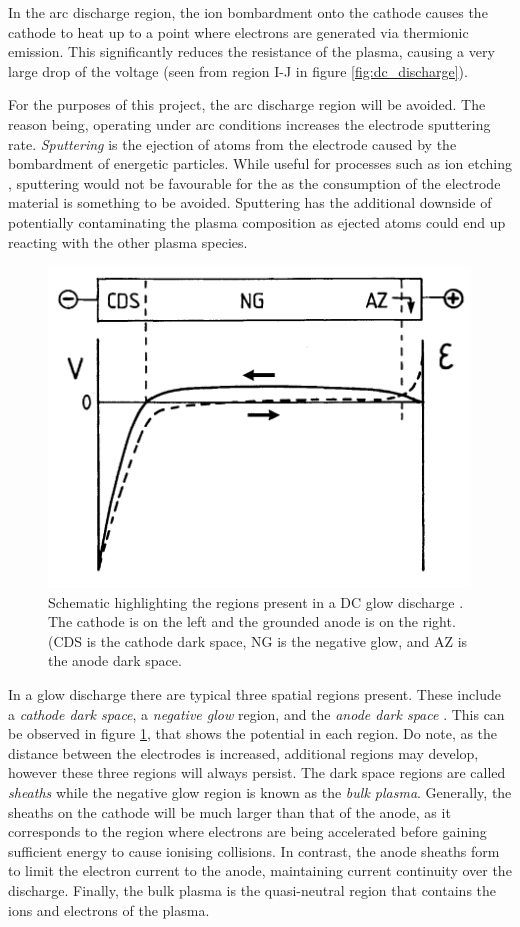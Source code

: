 In the arc discharge region, the ion bombardment onto the cathode causes the cathode to heat up to a point where electrons are generated via thermionic emission. This significantly reduces the resistance of the plasma, causing a very large drop of the voltage (seen from region I-J in figure \ref{fig:dc_discharge}). 

For the purposes of this project, the arc discharge region will be avoided. The reason being, operating under arc conditions increases the electrode sputtering rate. \textit{Sputtering} is the ejection of atoms from the electrode caused by the bombardment of energetic particles. While useful for processes such as ion etching \cite{Lieberman2005}, sputtering would not be favourable for the as the consumption of the electrode material is something to be avoided. Sputtering has the additional downside of potentially contaminating the plasma composition as ejected atoms could end up reacting with the other plasma species. 

\begin{figure}[h!]
	\centering
	\includegraphics[width=0.7\linewidth]{chapter_2/figures/glow_discharge.png}
	\caption{Schematic highlighting the regions present in a DC glow discharge \cite{Bogaerts2002}. The cathode is on the left and the grounded anode is on the right. (CDS is the cathode dark space, NG is the negative glow, and AZ is the anode dark space.}
	\label{fig:glow_discharge}
\end{figure}

In a glow discharge there are typical three spatial regions present. These include a \textit{cathode dark space}, a \textit{negative glow} region, and the \textit{anode dark space} \cite{Gudmundsson2017, Bogaerts2002}. This can be observed in figure \ref{fig:glow_discharge}, that shows the potential in each region. Do note, as the distance between the electrodes is increased, additional regions may develop, however these three regions will always persist. The dark space regions are called \textit{sheaths} while the negative glow region is known as the \textit{bulk plasma}. Generally, the sheaths on the cathode will be much larger than that of the anode, as it corresponds to the region where electrons are being accelerated before gaining sufficient energy to cause ionising collisions. In contrast, the anode sheaths form to limit the electron current to the anode, maintaining current continuity over the discharge. Finally, the bulk plasma is the quasi-neutral region that contains the ions and electrons of the plasma.

